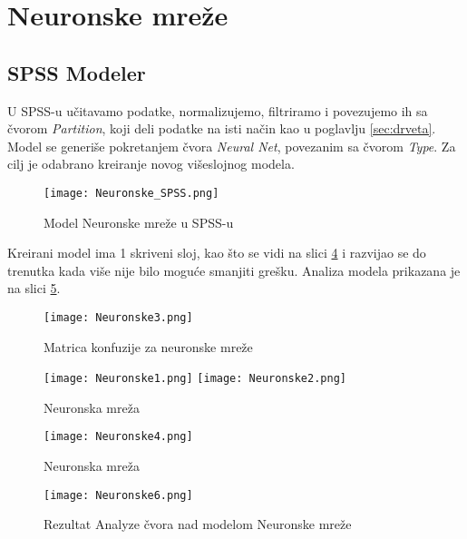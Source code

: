 \documentclass[a4paper]{article}
\begin{document}
\section{Neuronske mreže}
\label{sec:neuron}

\subsection{SPSS Modeler}

U SPSS-u učitavamo podatke, normalizujemo, filtriramo  i povezujemo ih sa čvorom \textit{Partition}, koji deli podatke na isti način kao u poglavlju \ref{sec:drveta}. Model se generiše pokretanjem čvora \textit{Neural Net}, povezanim sa čvorom \textit{Type}. Za cilj je odabrano kreiranje novog višeslojnog modela.

\begin{figure}[ht!]
	\centering
    \texttt{[image: Neuronske\_SPSS.png]}
    \caption{Model Neuronske mreže u SPSS-u}
    \label{fig:Neuronske_SPSS}
\end{figure}            


Kreirani model ima 1 skriveni sloj, kao što se vidi na slici \ref{fig:Neuronske4} i razvijao se do trenutka kada više nije bilo moguće smanjiti grešku. Analiza modela prikazana je na slici \ref{fig:Neuronske6}.
\\
\begin{figure}[ht!]
    \centering
    \texttt{[image: Neuronske3.png]}
    \caption{Matrica konfuzije za neuronske mreže}
    \label{fig:Neuronske3}
\end{figure}

\begin{figure}[ht!]
    \centering
    \texttt{[image: Neuronske1.png]}
    \texttt{[image: Neuronske2.png]}
    \caption{Neuronska mreža}
    \label{fig:Neuronske1}
\end{figure}


\begin{figure}[ht!]
    \centering
    \texttt{[image: Neuronske4.png]}
    \caption{Neuronska mreža}
    \label{fig:Neuronske4}
\end{figure}
\begin{figure}[ht!]
    \centering
    \texttt{[image: Neuronske6.png]}
    \caption{Rezultat Analyze čvora nad modelom Neuronske mreže}
    \label{fig:Neuronske6}
\end{figure}
\end{document}
